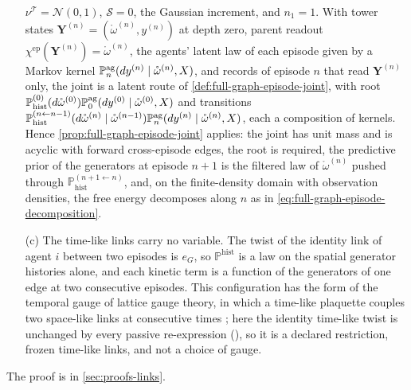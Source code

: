 \begin{enumerate}
$\nu^{\mathscr T}=\mathcal N(0,1)$, $\mathscr S=0$, the Gaussian increment, and $n_1=1$. With tower states
$\mathbf Y^{(n)}=(\mathring\omega^{(n)},y^{(n)})$ at depth zero, parent readout
$\chi^{\mathrm{ep}}(\mathbf Y^{(n)})=\mathring\omega^{(n)}$, the agents' latent law of each episode given
by a Markov kernel $\mathbb P^{\mathrm{ag}}_n(dy^{(n)}\given\mathring\omega^{(n)},X)$, and records of
episode $n$ that read $\mathbf Y^{(n)}$ only, the joint is a latent route of
\cref{def:full-graph-episode-joint}, with root
$\mathbb P^{(0)}_{\mathrm{hist}}(d\mathring\omega^{(0)})\mathbb P^{\mathrm{ag}}_0(dy^{(0)}\given\mathring\omega^{(0)},X)$ and transitions
$\mathbb P^{(n\leftarrow n-1)}_{\mathrm{hist}}(d\mathring\omega^{(n)}\given\mathring\omega^{(n-1)})\mathbb P^{\mathrm{ag}}_n(dy^{(n)}\given\mathring\omega^{(n)},X)$,
each a composition of kernels. Hence
\cref{prop:full-graph-episode-joint} applies: the joint has unit mass and is acyclic with forward
cross-episode edges, the root is required, the predictive prior of the generators at episode $n+1$ is
the filtered law of $\mathring\omega^{(n)}$ pushed through $\mathbb P^{(n+1\leftarrow n)}_{\mathrm{hist}}$, and, on the
finite-density domain with observation densities, the free energy decomposes along $n$ as in
\eqref{eq:full-graph-episode-decomposition}.
\item[(c)] The time-like links carry no variable. The twist of the identity link of agent $i$ between
two episodes is $e_G$, so $\mathbb P^{\mathrm{hist}}$ is a law on the spatial generator histories
alone, and each kinetic term is a function of the generators of one edge at two consecutive episodes.
This configuration has the form of the temporal gauge of lattice gauge theory, in which a
time-like plaquette couples two space-like links at consecutive times
\citep[Ch.~15, Eq.~(15.9)]{Creutz1983}; here the identity time-like twist is unchanged by every passive
re-expression (), so it is a declared restriction, frozen time-like
links, and not a choice of gauge.
\end{enumerate}

The proof is in \cref{sec:proofs-links}.

